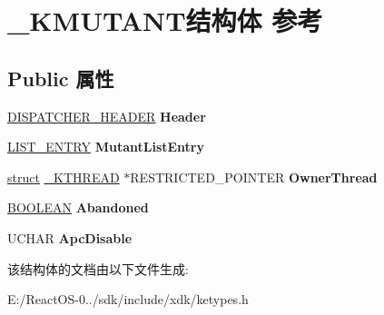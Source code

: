 \hypertarget{struct___k_m_u_t_a_n_t}{}\section{\+\_\+\+K\+M\+U\+T\+A\+N\+T结构体 参考}
\label{struct___k_m_u_t_a_n_t}
\subsection*{Public 属性}
\begin{DoxyCompactItemize}
\item 
\mbox{\label{struct___k_m_u_t_a_n_t_a41609f3e77dd283b6febdabc747c33d7}} 
\hyperlink{struct___d_i_s_p_a_t_c_h_e_r___h_e_a_d_e_r}{D\+I\+S\+P\+A\+T\+C\+H\+E\+R\+\_\+\+H\+E\+A\+D\+ER} {\bfseries Header}
\item 
\mbox{\label{struct___k_m_u_t_a_n_t_a57f86bb2cd6a99d4f3372c79ffa73dfb}} 
\hyperlink{struct___l_i_s_t___e_n_t_r_y}{L\+I\+S\+T\+\_\+\+E\+N\+T\+RY} {\bfseries Mutant\+List\+Entry}
\item 
\mbox{\label{struct___k_m_u_t_a_n_t_a7b8d3c729621741e40906d6d5519a55f}} 
\hyperlink{interfacestruct}{struct} \hyperlink{struct___k_t_h_r_e_a_d}{\+\_\+\+K\+T\+H\+R\+E\+AD} $\ast$R\+E\+S\+T\+R\+I\+C\+T\+E\+D\+\_\+\+P\+O\+I\+N\+T\+ER {\bfseries Owner\+Thread}
\item 
\mbox{\label{struct___k_m_u_t_a_n_t_a61128c8cea4564997417805624838089}} 
\hyperlink{_processor_bind_8h_a112e3146cb38b6ee95e64d85842e380a}{B\+O\+O\+L\+E\+AN} {\bfseries Abandoned}
\item 
\mbox{\label{struct___k_m_u_t_a_n_t_acc76eb200c3e78571682299c799bc896}} 
U\+C\+H\+AR {\bfseries Apc\+Disable}
\end{DoxyCompactItemize}


该结构体的文档由以下文件生成\+:\begin{DoxyCompactItemize}
\item 
E\+:/\+React\+O\+S-\/0../sdk/include/xdk/ketypes.\+h\end{DoxyCompactItemize}
